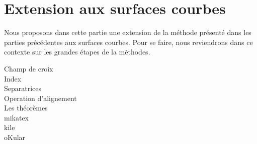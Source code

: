 \chapter{Extension aux surfaces courbes}
\label{chap:surface_courbe}
\minitoc

Nous proposons dans cette partie une extension de la méthode présenté dans les parties précédentes aux surfaces courbes. Pour se faire, nous reviendrons dans ce contexte sur les grandes étapes de la méthodes.

Champ de croix\\
Index\\
Separatrices\\
Operation d'alignement\\
Les théorèmes\\
mikatex\\
kile\\
oKular